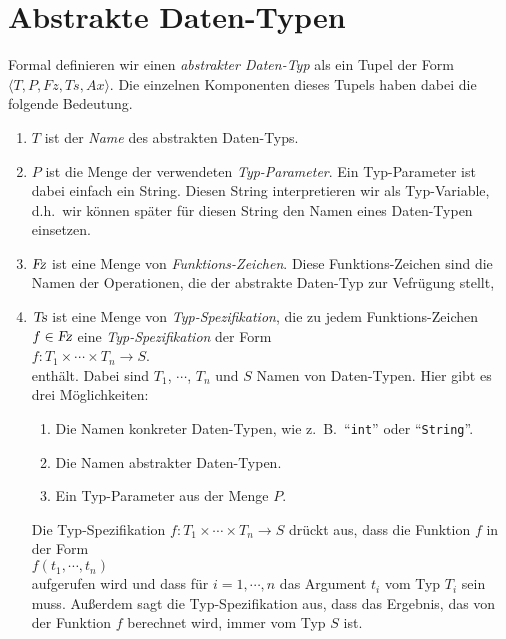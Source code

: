 \section{Abstrakte Daten-Typen}
Formal definieren wir einen \emph{abstrakter Daten-Typ} als ein Tupel der Form
 $\langle T, P, Fz, Ts, Ax \rangle$.
Die einzelnen Komponenten dieses Tupels haben dabei die folgende Bedeutung.
\begin{enumerate}
\item $T$ ist der \emph{Name} des abstrakten Daten-Typs.
\item $P$ ist die Menge der verwendeten \emph{Typ-Parameter}.  Ein Typ-Parameter ist dabei
      einfach ein String.  Diesen String interpretieren wir als Typ-Variable,
      d.h.~wir k\"onnen sp\"ater f\"ur diesen String den Namen eines Daten-Typen einsetzen.
\item $\textsl{Fz}$ ist eine Menge von \emph{Funktions-Zeichen}.  Diese Funktions-Zeichen
      sind die Namen der Operationen, die der abstrakte Daten-Typ zur Vefr\"ugung stellt,
\item $\textsl{Ts}$ ist eine Menge von \emph{Typ-Spezifikation}, die zu jedem Funktions-Zeichen
      $f \in \textsl{Fz}$
      eine \emph{Typ-Spezifikation} der Form \\[0.1cm]
      \hspace*{1.3cm} 
      $f: T_1 \times \cdots \times T_n \rightarrow S$. \\[0.1cm]
      enth\"alt. Dabei sind $T_1$, $\cdots$, $T_n$ und $S$ Namen von 
      Daten-Typen.  Hier gibt es drei M\"oglichkeiten: 
      \begin{enumerate}
      \item Die Namen konkreter Daten-Typen, wie z.~B.~``\texttt{int}'' 
            oder ``\texttt{String}''.
      \item Die Namen abstrakter Daten-Typen.
      \item Ein Typ-Parameter aus der Menge $P$.
      \end{enumerate}
      Die Typ-Spezifikation $f: T_1 \times \cdots \times T_n \rightarrow S$ dr\"uckt aus, dass die
      Funktion $f$ in der Form \\[0.1cm] 
      \hspace*{1.3cm} $f(t_1,\cdots,t_n)$ \\[0.1cm]
      aufgerufen wird und dass f\"ur $i=1,\cdots,n$ das Argument $t_i$ vom Typ
      $T_i$ sein muss.  Au{\ss}erdem sagt die Typ-Spezifikation aus, dass das
      Ergebnis, das von der Funktion $f$ berechnet wird, immer vom Typ $S$ ist.


\end{enumerate}

